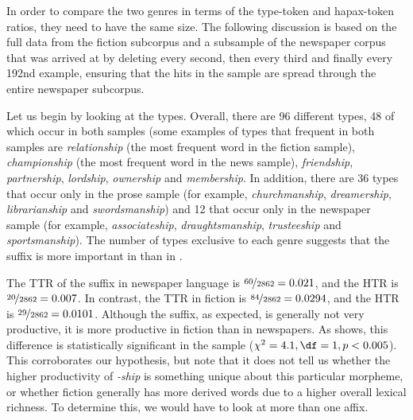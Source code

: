 In order to compare the two genres  in terms of the type\hyp{}token  and hapax\hyp{}token  ratios, they need to have the same size.  The following discussion is based on the full data from the fiction  subcorpus and a subsample of the newspaper  corpus that was arrived at by deleting every second, then every third and finally every 192nd example, ensuring that the hits  in the sample are spread through the entire newspaper  subcorpus.

Let us begin by looking at the types.  Overall, there are 96 different types, 48 of which occur in both samples (some examples of types that frequent in both samples are \textit{relationship} (the most frequent word in the fiction sample), \textit{championship} (the most frequent word in the news sample), \textit{friendship}, \textit{partnership}, \textit{lordship}, \textit{ownership} and \textit{membership}. In addition, there are 36 types that occur only in the prose sample (for example, \textit{churchmanship}, \textit{dreamership}, \textit{librarianship} and \textit{swordsmanship}) and 12 that occur only in the newspaper sample (for example, \textit{associateship}, \textit{draughtsmanship}, \textit{trusteeship} and \textit{sportsmanship}). The number of types  exclusive to each genre  suggests that the suffix  is more important in   than in  .

The TTR  of the suffix  in newspaper language is $\nicefrac{60}{2862} = 0.021$, and the HTR  is $\nicefrac{20}{2862} = 0.007$. In contrast, the TTR in fiction is $\nicefrac{84}{2862} = 0.0294$, and the HTR is $\nicefrac{29}{2862} = 0.0101$. Although the suffix,  as expected,  is generally not very productive,  it is more productive in fiction  than in newspapers.  As  shows, this difference is statistically significant in the sample ($\chi^2 = 4.1, \df = 1, p < 0.005$). This corroborates our hypothesis, but note that it does not tell us whether the higher productivity  of \textit{-ship} is something unique about this particular morpheme,  or whether fiction  generally has more derived words due to a higher overall lexical richness. To determine this, we would have to look at more than one  affix.

